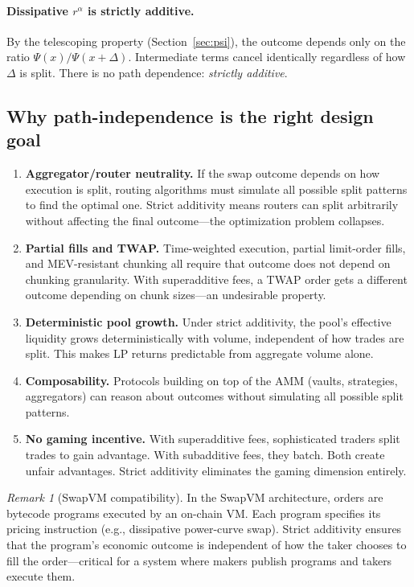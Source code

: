 \documentclass[11pt]{article}
\theoremstyle{definition}
\theoremstyle{remark}
\newtheorem{remark}[theorem]{Remark}
\begin{document}
\paragraph{Dissipative $r^\alpha$ is strictly additive.}
By the telescoping property (Section~\ref{sec:psi}), the outcome depends only on the ratio $\Psi(x)/\Psi(x{+}\Delta)$.
Intermediate terms cancel identically regardless of how $\Delta$ is split.
There is no path dependence: \emph{strictly additive}.

\subsection{Why path-independence is the right design goal}

\begin{enumerate}[label=(\alph*)]
\item \textbf{Aggregator/router neutrality.}
If the swap outcome depends on how execution is split, routing algorithms must simulate all possible split patterns to find the optimal one.
Strict additivity means routers can split arbitrarily without affecting the final outcome---the optimization problem collapses.

\item \textbf{Partial fills and TWAP.}
Time-weighted execution, partial limit-order fills, and MEV-resistant chunking all require that outcome does not depend on chunking granularity.
With superadditive fees, a TWAP order gets a different outcome depending on chunk sizes---an undesirable property.

\item \textbf{Deterministic pool growth.}
Under strict additivity, the pool's effective liquidity grows deterministically with volume, independent of how trades are split.
This makes LP returns predictable from aggregate volume alone.

\item \textbf{Composability.}
Protocols building on top of the AMM (vaults, strategies, aggregators) can reason about outcomes without simulating all possible split patterns.

\item \textbf{No gaming incentive.}
With superadditive fees, sophisticated traders split trades to gain advantage. With subadditive fees, they batch.
Both create unfair advantages. Strict additivity eliminates the gaming dimension entirely.
\end{enumerate}

\begin{remark}[SwapVM compatibility]
In the SwapVM architecture, orders are bytecode programs executed by an on-chain VM.
Each program specifies its pricing instruction (e.g., dissipative power-curve swap).
Strict additivity ensures that the program's economic outcome is independent of how the taker chooses to fill the order---critical for a system where makers publish programs and takers execute them.
\end{remark}
\end{document}
